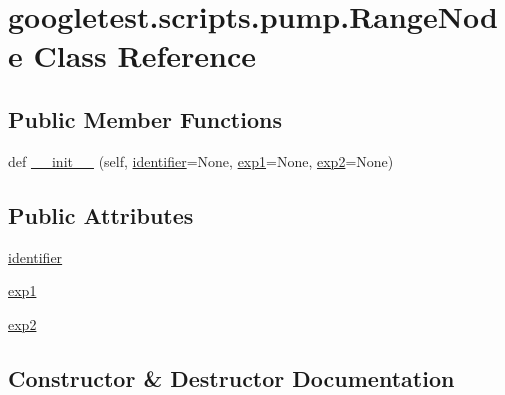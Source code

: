 \hypertarget{classgoogletest_1_1scripts_1_1pump_1_1_range_node}{}\section{googletest.\+scripts.\+pump.\+Range\+Node Class Reference}
\label{classgoogletest_1_1scripts_1_1pump_1_1_range_node}
\subsection*{Public Member Functions}
\begin{DoxyCompactItemize}
\item 
def \mbox{\hyperlink{classgoogletest_1_1scripts_1_1pump_1_1_range_node_a969ac7d50a6fae864e9526dd87324482}{\+\_\+\+\_\+init\+\_\+\+\_\+}} (self, \mbox{\hyperlink{classgoogletest_1_1scripts_1_1pump_1_1_range_node_a92fa70aea83838062968be874ee9d487}{identifier}}=None, \mbox{\hyperlink{classgoogletest_1_1scripts_1_1pump_1_1_range_node_a9dd675a72e379bfcc7e21b9734759552}{exp1}}=None, \mbox{\hyperlink{classgoogletest_1_1scripts_1_1pump_1_1_range_node_a14abe82e7ea41ad738463bbe995cf93a}{exp2}}=None)
\end{DoxyCompactItemize}
\subsection*{Public Attributes}
\begin{DoxyCompactItemize}
\item 
\mbox{\hyperlink{classgoogletest_1_1scripts_1_1pump_1_1_range_node_a92fa70aea83838062968be874ee9d487}{identifier}}
\item 
\mbox{\hyperlink{classgoogletest_1_1scripts_1_1pump_1_1_range_node_a9dd675a72e379bfcc7e21b9734759552}{exp1}}
\item 
\mbox{\hyperlink{classgoogletest_1_1scripts_1_1pump_1_1_range_node_a14abe82e7ea41ad738463bbe995cf93a}{exp2}}
\end{DoxyCompactItemize}


\subsection{Constructor \& Destructor Documentation}
\mbox{\label{classgoogletest_1_1scripts_1_1pump_1_1_range_node_a969ac7d50a6fae864e9526dd87324482}} 
